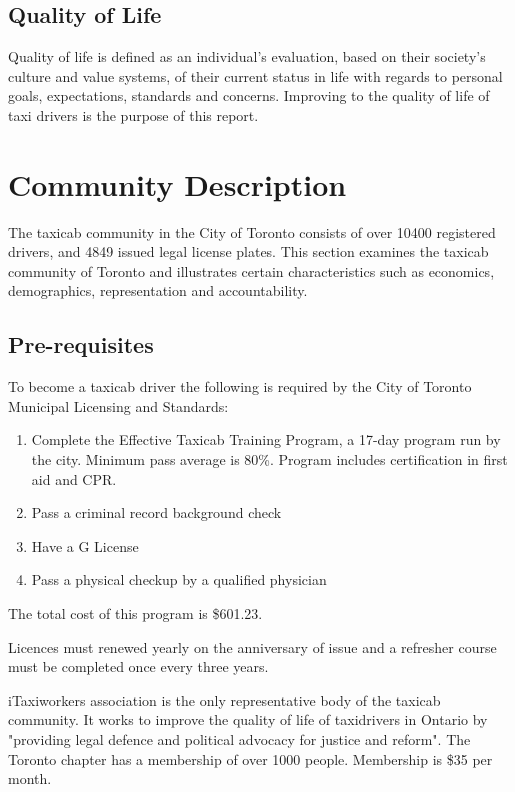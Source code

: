 \documentclass[11pt]{article}
\begin{document}
\subsection{Quality of Life}
\label{sec:lifequal}

Quality of life is defined as an individual’s evaluation, based on
their society’s culture and value systems, of their current status in
life with regards to personal goals, expectations, standards and
concerns. Improving to the quality of life of taxi drivers is the
purpose of this report.

\section{Community Description}
\label{sec:community}
The taxicab community in the City of Toronto consists of over 10400 registered drivers, 
and 4849 issued legal license plates. This section examines the taxicab community of Toronto and 
illustrates certain characteristics such as economics, demographics, representation and accountability.

\subsection{Pre-requisites}
To become a taxicab driver the following is required by the City of Toronto Municipal Licensing and Standards:
\begin{enumerate}
\item Complete the Effective Taxicab Training Program, a 17-day program run by the city. 
Minimum pass average is 80\%. Program includes certification in first aid and CPR.
\item Pass a criminal record background check
\item Have a G License
\item Pass a physical checkup by a qualified physician
\end{enumerate}
The total cost of this program is \$601.23\cite{MLS2013}.

Licences must renewed yearly on the anniversary of issue and a refresher course must 
be completed once every three years\cite{MLSChp545}.

iTaxiworkers association is the only representative body of the taxicab community. It
works to improve the quality of life of taxidrivers in Ontario by "providing legal defence
and political advocacy for justice and reform"\cite{iTaxiWorkers2012}. The Toronto chapter
has a membership of over 1000 people. Membership is \$35 per month\cite{iTaxi2012, Abdiemail}.
\end{document}
